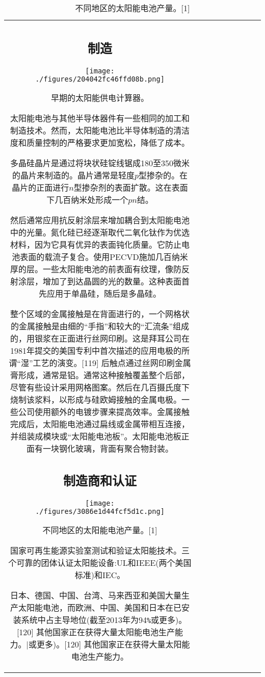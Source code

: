 \begin{table}[ht]
\begin{tabular}{|c|c|c|c|c|c|c|c|c}
\subsection{制造}

\begin{figure}[ht]
\centering
\texttt{[image: ./figures/204042fc46ffd08b.png]}
\caption{早期的太阳能供电计算器。} \label{fig_TYNDC_3}
\end{figure}

太阳能电池与其他半导体器件有一些相同的加工和制造技术。然而，太阳能电池比半导体制造的清洁度和质量控制的严格要求更加宽松，降低了成本。

多晶硅晶片是通过将块状硅锭线锯成180至350微米的晶片来制造的。晶片通常是轻度$p$型掺杂的。在晶片的正面进行$n$型掺杂剂的表面扩散。这在表面下几百纳米处形成一个$pn$结。

然后通常应用抗反射涂层来增加耦合到太阳能电池中的光量。氮化硅已经逐渐取代二氧化钛作为优选材料，因为它具有优异的表面钝化质量。它防止电池表面的载流子复合。使用PECVD施加几百纳米厚的层。一些太阳能电池的前表面有纹理，像防反射涂层，增加了到达晶圆的光的数量。这种表面首先应用于单晶硅，随后是多晶硅。

整个区域的金属接触是在背面进行的，一个网格状的金属接触是由细的“手指”和较大的“汇流条”组成的，用银浆在正面进行丝网印刷。这是拜耳公司在1981年提交的美国专利中首次描述的应用电极的所谓“湿”工艺的演变。[119] 后触点通过丝网印刷金属膏形成，通常是铝。通常这种接触覆盖整个后部，尽管有些设计采用网格图案。然后在几百摄氏度下烧制该浆料，以形成与硅欧姆接触的金属电极。一些公司使用额外的电镀步骤来提高效率。金属接触完成后，太阳能电池通过扁线或金属带相互连接，并组装成模块或“太阳能电池板”。太阳能电池板正面有一块钢化玻璃，背面有聚合物封装。

\subsection{制造商和认证}

\begin{figure}[ht]
\centering
\texttt{[image: ./figures/3086e1d44fcf5d1c.png]}
\caption{不同地区的太阳能电池产量。[1]} \label{fig_TYNDC_2}
\end{figure}

国家可再生能源实验室测试和验证太阳能技术。三个可靠的团体认证太阳能设备:UL和IEEE(两个美国标准)和IEC。

日本、德国、中国、台湾、马来西亚和美国大量生产太阳能电池，而欧洲、中国、美国和日本在已安装系统中占主导地位(截至2013年为94\verb|%|或更多)。[120] 其他国家正在获得大量太阳能电池生产能力。


\end{tabular}
\end{table}
